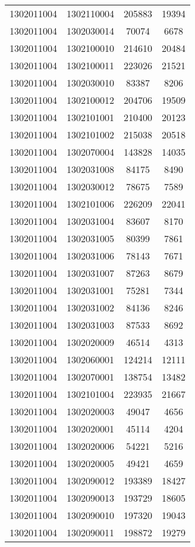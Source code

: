 \begin{longtable}[h]{llcc}
		1302011004 & 1302110004 & 205883 & 19394\\
		1302011004 & 1302030014 & 70074 & 6678\\
		1302011004 & 1302100010 & 214610 & 20484\\
		1302011004 & 1302100011 & 223026 & 21521\\
		1302011004 & 1302030010 & 83387 & 8206\\
		1302011004 & 1302100012 & 204706 & 19509\\
		1302011004 & 1302101001 & 210400 & 20123\\
		1302011004 & 1302101002 & 215038 & 20518\\
		1302011004 & 1302070004 & 143828 & 14035\\
		1302011004 & 1302031008 & 84175 & 8490\\
		1302011004 & 1302030012 & 78675 & 7589\\
		1302011004 & 1302101006 & 226209 & 22041\\
		1302011004 & 1302031004 & 83607 & 8170\\
		1302011004 & 1302031005 & 80399 & 7861\\
		1302011004 & 1302031006 & 78143 & 7671\\
		1302011004 & 1302031007 & 87263 & 8679\\
		1302011004 & 1302031001 & 75281 & 7344\\
		1302011004 & 1302031002 & 84136 & 8246\\
		1302011004 & 1302031003 & 87533 & 8692\\
		1302011004 & 1302020009 & 46514 & 4313\\
		1302011004 & 1302060001 & 124214 & 12111\\
		1302011004 & 1302070001 & 138754 & 13482\\
		1302011004 & 1302101004 & 223935 & 21667\\
		1302011004 & 1302020003 & 49047 & 4656\\
		1302011004 & 1302020001 & 45114 & 4204\\
		1302011004 & 1302020006 & 54221 & 5216\\
		1302011004 & 1302020005 & 49421 & 4659\\
		1302011004 & 1302090012 & 193389 & 18427\\
		1302011004 & 1302090013 & 193729 & 18605\\
		1302011004 & 1302090010 & 197320 & 19043\\
		1302011004 & 1302090011 & 198872 & 19279\\

\end{longtable}
